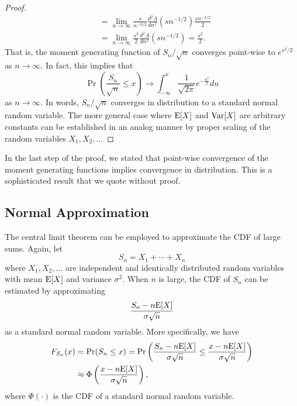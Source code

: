 \begin{proof}
\begin{equation*}
\begin{split}
&= \lim_{n \rightarrow \infty} \frac{s}{n^{-3/2}}
\frac{d^2 \Lambda}{dn^2} \left( s n^{-1/2} \right) \frac{s n^{-3/2}}{2} \\
&= \lim_{n \rightarrow \infty} \frac{s^2}{2}
\frac{d^2 \Lambda}{dn^2} \left( s n^{-1/2} \right) = \frac{s^2}{2} .
\end{split}
\end{equation*}
That is, the moment generating function of $S_n / \sqrt{n}$ converges point-wise to $e^{s^2/2}$ as $n \rightarrow \infty$.
In fact, this implies that
\begin{equation*}
\Pr \left( \frac{S_n}{\sqrt{n}} \leq x \right) \rightarrow \int_{-\infty}^x \frac{1}{\sqrt{2 \pi}} e^{-\frac{u^2}{2}} du
\end{equation*}
as $n \rightarrow \infty$.
In words, $S_n / \sqrt{n}$ converges in distribution to a standard normal random variable.
The more general case where $\mathrm{E} [X]$ and $\mathrm{Var} [X]$ are arbitrary constants can be established in an analog manner by proper scaling of the random variables $X_1, X_2, \ldots$
\end{proof}

In the last step of the proof, we stated that point-wise convergence of the moment generating functions implies convergence in distribution.
This is a sophisticated result that we quote without proof.


\subsection{Normal Approximation}

The central limit theorem can be employed to approximate the CDF of large sums.
Again, let
\begin{equation*}
S_n = X_1 + \cdots + X_n
\end{equation*}
where $X_1, X_2, \ldots$ are independent and identically distributed random variables with mean $\mathrm{E} [X]$ and variance $\sigma^2$.
When $n$ is large, the CDF of $S_n$ can be estimated by approximating
\begin{equation*}
\frac{ S_n - n \mathrm{E} [X] } { \sigma \sqrt{n} }
\end{equation*}
as a standard normal random variable.
More specifically, we have
\begin{equation*}
\begin{split}
F_{S_n} (x) 
&= \Pr (S_n \leq x)
= \Pr \left( \frac{ S_n - n \mathrm{E} [X] }{ \sigma \sqrt{n} }
\leq \frac{x - n \mathrm{E} [X]}{\sigma \sqrt{n}} \right) \\
&\approx \Phi \left( \frac{x - n \mathrm{E} [X]}{\sigma \sqrt{n}} \right) ,
\end{split}
\end{equation*}
where $\Phi (\cdot)$ is the CDF of a standard normal random variable.


